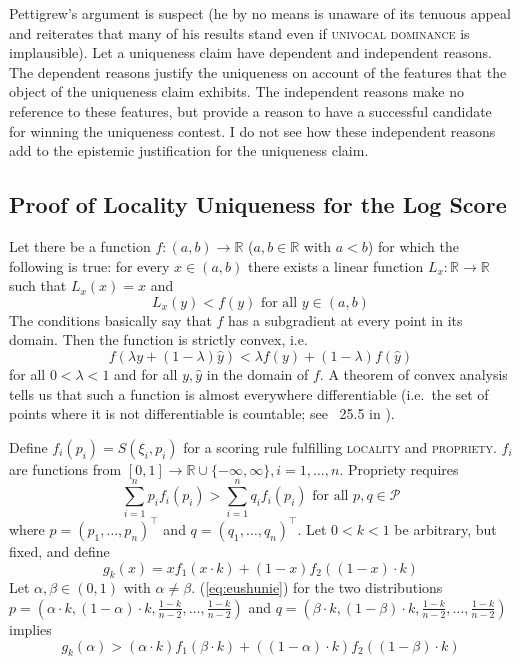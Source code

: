 \documentclass[12pt]{article}
\begin{document}
Pettigrew's argument is suspect (he by no means is unaware of its
tenuous appeal and reiterates that many of his results stand even if
\textsc{univocal dominance} is implausible). Let a uniqueness claim
have dependent and independent reasons. The dependent reasons justify
the uniqueness on account of the features that the object of the
uniqueness claim exhibits. The independent reasons make no reference
to these features, but provide a reason to have a successful candidate
for winning the uniqueness contest. I do not see how these independent
reasons add to the epistemic justification for the uniqueness claim.

\subsection{Proof of Locality Uniqueness for the Log Score}
\label{subsec:kaixitun}

Let there be a function $f:(a,b)\rightarrow\mathbb{R}$
($a,b\in\mathbb{R}$ with $a<b$) for which the following is true: for
every $x\in(a,b)$ there exists a linear function
$L_{x}:\mathbb{R}\rightarrow\mathbb{R}$ such that $L_{x}(x)=x$ and
\begin{equation}
  \label{eq:jeedushe}
  L_{x}(y)<f(y)\mbox{ for all }y\in(a,b)
\end{equation}
The conditions basically say that $f$ has a subgradient at every point
in its domain. Then the function is strictly convex, i.e.
\begin{equation}
  \label{eq:poawaimo}
  f(\lambda{}y+(1-\lambda)\hat{y})<\lambda{}f(y)+(1-\lambda)f(\hat{y})
\end{equation}
for all $0<\lambda<1$ and for all $y,\hat{y}$ in the domain of $f$. A
theorem of convex analysis tells us that such a function is almost
everywhere differentiable (i.e.\ the set of points where it is not
differentiable is countable; see {\heorem}~25.5 in
). 

Define $f_{i}(p_{i})=S(\xi_{i},p_{i})$ for a scoring rule fulfilling
\textsc{locality} and \textsc{propriety}. $f_{i}$ are functions from
$[0,1]\rightarrow\mathbb{R}\cup\{-\infty,\infty\},i=1,{\ldots},n$.
Propriety requires
\begin{equation}
  \label{eq:eushunie}
  \sum_{i=1}^{n}p_{i}f_{i}(p_{i})>\sum_{i=1}^{n}q_{i}f_{i}(p_{i})\mbox{ for all }p,q\in\mathcal{P}
\end{equation}
where $p=(p_{1},{\ldots},p_{n})^{\intercal}$ and
$q=(q_{1},{\ldots},q_{n})^{\intercal}$. Let $0<k<1$ be arbitrary, but
fixed, and define
\begin{equation}
  \label{eq:rozosuzo}
  g_{k}(x)=xf_{1}(x\cdot{}k)+(1-x)f_{2}((1-x)\cdot{}k)
\end{equation}
Let $\alpha,\beta\in(0,1)$ with $\alpha\neq{}\beta$.
(\ref{eq:eushunie}) for the two distributions
$p=(\alpha\cdot{}k,(1-\alpha)\cdot{}k,\frac{1-k}{n-2},{\ldots},\frac{1-k}{n-2})$
and
$q=(\beta\cdot{}k,(1-\beta)\cdot{}k,\frac{1-k}{n-2},{\ldots},\frac{1-k}{n-2})$
implies
\begin{equation}
  \label{eq:luophaek}
  g_{k}(\alpha)>(\alpha\cdot{}k)f_{1}(\beta\cdot{}k)+((1-\alpha)\cdot{}k)f_{2}((1-\beta)\cdot{}k)
\end{equation}
\end{document}
